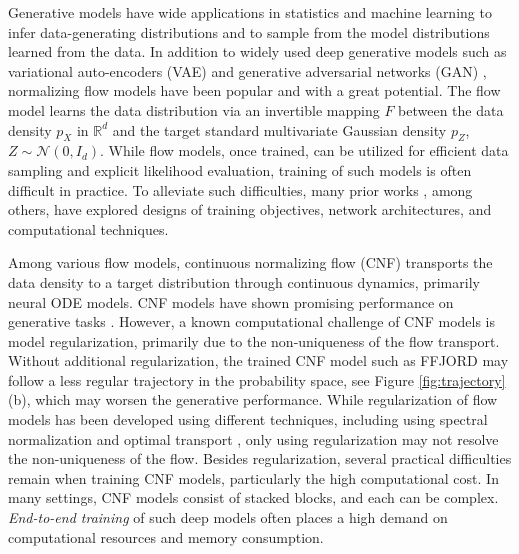 \documentclass{article}
\theoremstyle{remark}
\theoremstyle{plain}
\newcommand{\calN}{\mathcal{N}}
\newcommand{\revold}[1]{{\color{black}#1}}
\begin{document}
Generative models have wide applications in statistics and machine learning to infer data-generating distributions 
and to sample from the model distributions learned from the data. 
In addition to widely used deep generative models such as variational auto-encoders (VAE) \cite{VAE,VAE_review}
and generative adversarial networks (GAN) \cite{GAN,WassersteinGAN}, normalizing flow models \cite{nflow_review} have been popular and with a great potential. The flow model learns the data distribution via an invertible mapping $F$ between the data density $p_X$ in $\mathbb{R}^d$ and the target standard multivariate Gaussian density $p_Z$, $Z \sim \calN (0,I_d)$. 
While flow models, once trained, can be utilized for efficient data sampling and explicit likelihood evaluation, training of such models is often difficult in practice. To alleviate such difficulties, many prior works \citep{dinh2015nice,RNVP,kingma2018glow,iResnet,ruthotto2020machine,OT-Flow}, among others, have explored designs of training objectives, network architectures, and computational techniques.

Among various flow models, continuous normalizing flow (CNF) transports the data density to a target distribution through continuous dynamics, primarily neural ODE \citep{chen2018neural} models. CNF models have shown promising performance on generative tasks \cite{FFJORD,nflow_review}. 
However, a known computational challenge of CNF models is model regularization, primarily due to the non-uniqueness of the flow transport. 
Without additional regularization, the trained CNF model \revold{such as FFJORD \cite{FFJORD}} may follow a less regular trajectory in the probability space, see Figure \ref{fig:trajectory}(b),
which may worsen the generative performance.
%
While regularization of flow models has been developed using different techniques, including using spectral normalization \cite{iResnet} and optimal transport \cite{liutkus2019sliced,OT-Flow,finlay2020train,xu2022invertible,huang2023bridging}, only using regularization may not resolve the non-uniqueness of the flow.
%
Besides regularization, several practical difficulties remain when training CNF models, particularly the high computational cost.
In many settings, CNF models consist of stacked blocks, and each can be complex. 
{\it End-to-end training} of such deep models often places a high demand on computational resources and memory consumption. 
\end{document}

